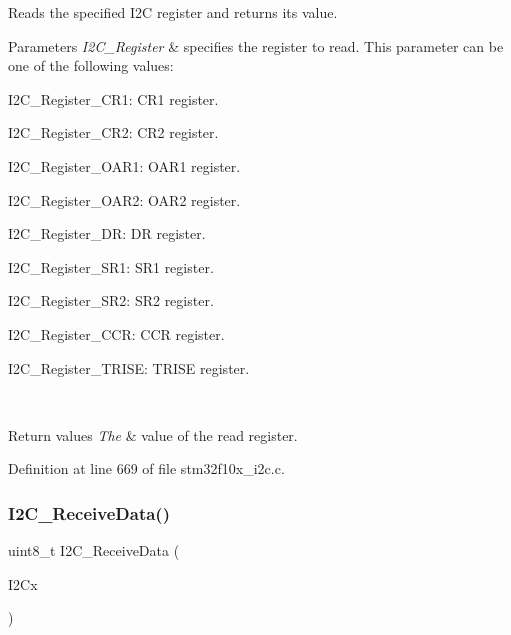 Reads the specified I2C register and returns its value. 


\begin{DoxyParams}{Parameters}
{\em I2\+C\+\_\+\+Register} & specifies the register to read. This parameter can be one of the following values\+: \begin{DoxyItemize}
\item I2\+C\+\_\+\+Register\+\_\+\+C\+R1\+: C\+R1 register. \item I2\+C\+\_\+\+Register\+\_\+\+C\+R2\+: C\+R2 register. \item I2\+C\+\_\+\+Register\+\_\+\+O\+A\+R1\+: O\+A\+R1 register. \item I2\+C\+\_\+\+Register\+\_\+\+O\+A\+R2\+: O\+A\+R2 register. \item I2\+C\+\_\+\+Register\+\_\+\+DR\+: DR register. \item I2\+C\+\_\+\+Register\+\_\+\+S\+R1\+: S\+R1 register. \item I2\+C\+\_\+\+Register\+\_\+\+S\+R2\+: S\+R2 register. \item I2\+C\+\_\+\+Register\+\_\+\+C\+CR\+: C\+CR register. \item I2\+C\+\_\+\+Register\+\_\+\+T\+R\+I\+SE\+: T\+R\+I\+SE register. \end{DoxyItemize}
\\
\hline
\end{DoxyParams}

\begin{DoxyRetVals}{Return values}
{\em The} & value of the read register. \\
\hline
\end{DoxyRetVals}


Definition at line 669 of file stm32f10x\+\_\+i2c.\+c.

\mbox{\label{group___i2_c___private___functions_gaeaaa4b6f77f50eb57465148c55d27fb2}} 
\subsubsection{\texorpdfstring{I2\+C\+\_\+\+Receive\+Data()}{I2C\_ReceiveData()}}
{\footnotesize\ttfamily uint8\+\_\+t I2\+C\+\_\+\+Receive\+Data (\begin{DoxyParamCaption}\item[{\hyperlink{struct_i2_c___type_def}{I2\+C\+\_\+\+Type\+Def} $\ast$}]{I2\+Cx }\end{DoxyParamCaption})}



